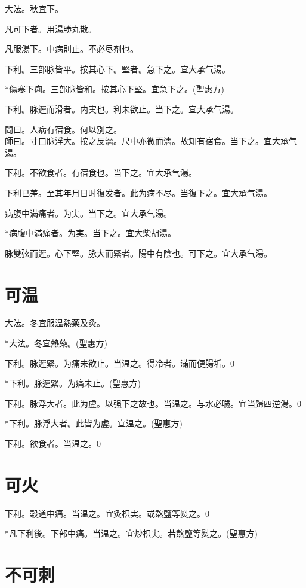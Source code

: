 \documentclass[12pt,twoside,UTF8,b5paper]{ctexbook}
\begin{document}
大法。秋宜下。

凡可下者。用湯勝丸散。

凡服湯下。中病則止。不必尽剂也。

下利。三部脉皆平。按其心下。堅者。急下之。宜{大}承气湯。

*傷寒下痢。三部脉皆和。按其心下堅。宜急下之。(聖惠方)

下利。脉遲而滑者。{内}実也。利未欲止。当下之。宜{大}承气湯。

問曰。人病有宿食。何以別之。\\
師曰。寸口脉浮大。按之反濇。尺中亦微而濇。故知有宿食。当下之。宜{大}承气湯。

下利。不欲食者。有宿食也。当下之。宜{大}承气湯。

下利{已}差。至其{年月日}时復发者。此为病不尽。当復下之。宜{大}承气湯。

病腹中滿痛者。为実。当下之。宜大承气湯。

*病腹中滿痛者。为実。当下之。宜大柴胡湯。

脉雙弦而遲。心下堅。脉大而緊者。陽中有陰也。可下之。宜{大}承气湯。

\chapter{可温}

大法。冬宜服温熱藥及灸。

*大法。冬宜熱藥。(聖惠方)

下利。脉遲緊。为痛未欲止。当温之。得冷者。滿而便腸垢。0

*下利。脉遲緊。为痛未止。(聖惠方)

下利。脉浮大者。此为虗。以强下之故也。当温之。与水必噦。{宜当歸四逆湯。}0

*下利。脉浮大者。此皆为虗。宜温之。(聖惠方)

下利。欲食者。当温之。0

\chapter{可火}

下利。穀道中痛。当温之。宜灸枳実。或熬鹽等熨之。0

*凡下利後。下部中痛。当温之。宜炒枳実。若熬鹽等熨之。(聖惠方)

\chapter{不可刺}
\end{document}
